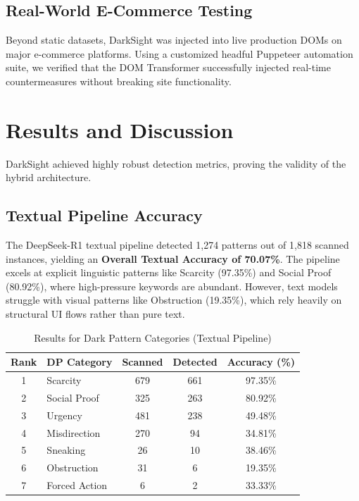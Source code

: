 \documentclass[12pt,a4paper]{article}
\begin{document}
\subsection{Real-World E-Commerce Testing}
Beyond static datasets, DarkSight was injected into live production DOMs on major e-commerce platforms. Using a customized headful Puppeteer automation suite, we verified that the DOM Transformer successfully injected real-time countermeasures without breaking site functionality.

\section{Results and Discussion}
DarkSight achieved highly robust detection metrics, proving the validity of the hybrid architecture. 

\subsection{Textual Pipeline Accuracy}
The DeepSeek-R1 textual pipeline detected 1,274 patterns out of 1,818 scanned instances, yielding an \textbf{Overall Textual Accuracy of 70.07\%}. The pipeline excels at explicit linguistic patterns like Scarcity (97.35\%) and Social Proof (80.92\%), where high-pressure keywords are abundant. However, text models struggle with visual patterns like Obstruction (19.35\%), which rely heavily on structural UI flows rather than pure text.

\begin{table}[htbp]
\centering
\caption{Results for Dark Pattern Categories (Textual Pipeline)}
\begin{tabular}{|c|l|c|c|c|}
\hline
\textbf{Rank} & \textbf{DP Category} & \textbf{Scanned} & \textbf{Detected} & \textbf{Accuracy (\%)} \\ \hline
1 & Scarcity & 679 & 661 & 97.35\% \\ \hline
2 & Social Proof & 325 & 263 & 80.92\% \\ \hline
3 & Urgency & 481 & 238 & 49.48\% \\ \hline
4 & Misdirection & 270 & 94 & 34.81\% \\ \hline
5 & Sneaking & 26 & 10 & 38.46\% \\ \hline
6 & Obstruction & 31 & 6 & 19.35\% \\ \hline
7 & Forced Action & 6 & 2 & 33.33\% \\ \hline
\end{tabular}
\end{table}
\end{document}
